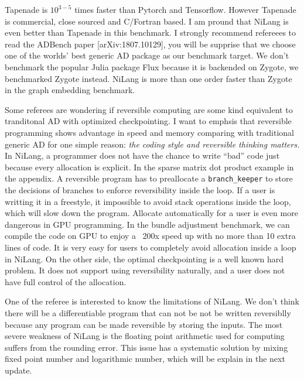 \documentclass{article}
\begin{document}
Tapenade is $10^{3-5}$ times faster than Pytorch and Tensorflow. However Tapenade is commercial, close sourced and C/Fortran based.
I am pround that NiLang is even better than Tapenade in this benchmark.
I strongly recommend refereees to read the ADBench paper [arXiv:1807.10129], you will be supprise that we choose one of the worlds' best generic AD package as our benchmark target.
We don't benchmark the popular Julia package Flux because it is backended on Zygote, we benchmarked Zygote instead. NiLang is more than one order faster than Zygote in the graph embedding benchmark.

Some referees are wondering if reversible computing are some kind equivalent to tranditonal AD with optimized checkpointing.
I want to emphsis that reversible programming shows advantage in speed and memory comparing with traditional generic AD for one simple reason: \textit{the coding style and reversible thinking matters.}
In NiLang, a programmer does not have the chance to write ``bad'' code just because every allocation is explicit.
In the sparse matrix dot product example in the appendix.
A reversible program has to preallocate a \texttt{branch\_keeper} to store the decisions of branches to enforce reversibility inside the loop.
If a user is writting it in a freestyle, it impossible to avoid stack operations inside the loop, which will slow down the program.
Allocate automatically for a user is even more dangerous in GPU programming.
In the bundle adjustment benchmark, %
we can compile the code on GPU to enjoy a ~200x speed up with no more than 10 extra lines of code.
It is very easy for users to completely avoid allocation inside a loop in NiLang.
On the other side, the optimal checkpointing is a well known hard problem. It does not support using reversibility naturally, and a user does not have full control of the allocation.

One of the referee is interested to know the limitations of NiLang. We don't think there will be a differentiable program that can not be not be written reversiblly because any program can be made reversible by storing the inputs. The most severe weakness of NiLang is the floating point arithmetic used for computing suffers from the rounding error.
This issue has a systematic solution by mixing fixed point number and logarithmic number, which will be explain in the next update.
\end{document}
